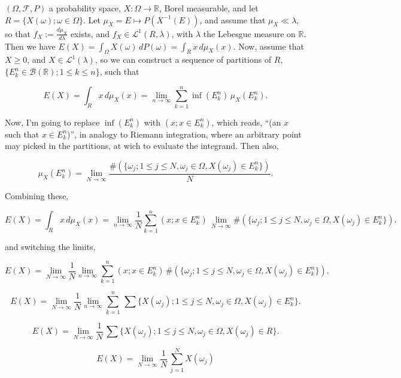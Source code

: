 \documentclass[12pt]{article}
\begin{document}
$(\Omega, \mathcal{F}, P)$ a probability space, $X: \Omega \rightarrow \mathbb{R}$, Borel measurable, and let $R = \{ X(\omega); \omega \in \Omega \}$. Let $\mu_X = E \mapsto P(X^{-1}(E))$, and assume that $\mu_X \ll \lambda$, so that $f_X := \frac{d \mu_X}{d \lambda}$ exists, and $f_X \in \mathcal{L}^1(R, \lambda)$, with $\lambda$ the Lebesgue measure on $\mathbb{R}$. Then we have $E(X) = \int_\Omega X(\omega) \,  dP(\omega) = \int_R x \, d\mu_X(x)$. Now, assume that $X \ge 0$, and $X \in \mathcal{L}^1(\lambda)$, so we can construct a sequence of partitions of $R$, $\{ E_k^n \in \mathcal{B}(\mathbb{R}); 1 \le k \le n \}$, such that

$$
E(X)  = \int_R x \, d\mu_X(x) = \lim_{n \rightarrow \infty} \sum_{k=1}^n \inf( E_k^n) \, \mu_X(E_k^n).
$$

Now, I'm going to replace $\inf( E_k^n)$ with $(x; x \in E_k^n)$, which reads, ``(an $x$ such that $x \in E_k^n$)'', in analogy to Riemann integration, where an arbitrary point may picked in the partitions, at wich to evaluate the integrand. Then also,

$$
\mu_X(E_k^n) = \lim_{N \rightarrow \infty} \frac{\#(\{ \omega_j; 1 \le j \le N, \omega_j \in \Omega, X(\omega_j) \in E_k^n \})}{N}.
$$

Combining these,


$$
E(X) =  \int_R x \, d\mu_X(x) = \lim_{n \rightarrow \infty} \frac{1}{N}  \sum_{k=1}^n (x; x \in E_k^n)  \, \lim_{N \rightarrow \infty} \#(\{ \omega_j; 1 \le j \le N, \omega_j \in \Omega, X(\omega_j) \in E_k^n \}).
$$

and switching the limits, 

$$
E(X) =  \lim_{N \rightarrow \infty} \frac{1}{N} \lim_{n \rightarrow \infty} \sum_{k=1}^n (x; x \in E_k^n)  \, \#(\{ \omega_j; 1 \le j \le N, \omega_j \in \Omega, X(\omega_j) \in E_k^n \}).
$$

$$
E(X)  =  \lim_{N \rightarrow \infty} \frac{1}{N} \lim_{n \rightarrow \infty} \sum_{k=1}^n \,\sum \{  X(\omega_j) ; 1 \le j \le N, \omega_j \in \Omega, X(\omega_j) \in E_k^n \}.
$$


$$
E(X)  =  \lim_{N \rightarrow \infty} \frac{1}{N}  \,\sum \{  X(\omega_j) ; 1 \le j \le N, \omega_j \in \Omega, X(\omega_j) \in R \}.
$$


$$
E(X)  =  \lim_{N \rightarrow \infty} \frac{1}{N}  \,\sum_{j=1}^N   X(\omega_j)
$$
\end{document}
